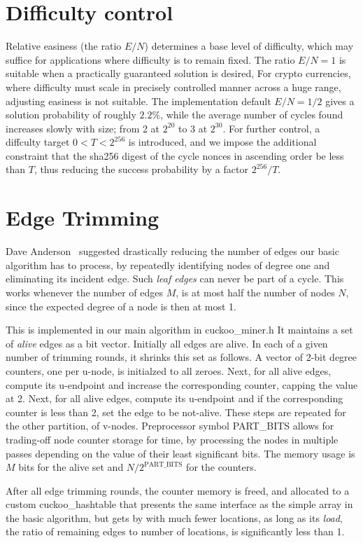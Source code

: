 \documentclass[11pt, oneside]{article}
\begin{document}
\section{Difficulty control}
Relative easiness (the ratio $E/N$) determines a base level of difficulty,
which may suffice for applications where difficulty is to remain fixed.
The ratio $E/N=1$ is suitable when a practically guaranteed solution is desired,
For crypto currencies, where difficulty must scale in precisely
controlled manner across a huge range, adjusting easiness is not suitable.
The implementation default $E/N=1/2$ gives a solution probability of roughly $2.2\%$,
while the average number of cycles found increases slowly with size; from 2 at $2^{20}$
to 3 at $2^{30}$.
For further control, a diffculty target $0 < T < 2^{256}$ is introduced,
and we impose the additional constraint that the sha256 digest of the
cycle nonces in ascending order be less than $T$, thus
reducing the success probability by a factor $2^{256}/T$.

\section{Edge Trimming}
Dave Anderson~\cite{dga2014} suggested drastically reducing the number of edges
our basic algorithm has to process, by repeatedly identifying nodes of degree one
and eliminating its incident edge. Such {\em leaf edges} can never be part of a cycle.
This works whenever the number of edges $M$, is at most half the number of nodes $N$,
since the expected degree of a node is then at most 1.

This is implemented in our main algorithm in cuckoo\_miner.h
It maintains a set of {\em alive} edges as a bit vector. Initially all edges are alive.
In each of a given number of trimming rounds, it shrinks this set as follows.
A vector of 2-bit degree counters, one per u-node, is initialzed to all zeroes.
Next, for all alive edges, compute its u-endpoint and increase the corresponding counter,
capping the value at 2.
Next, for all alive edges, compute its u-endpoint and if the corresponding counter is less than 2,
set the edge to be not-alive.
These steps are repeated for the other partition, of v-nodes.
Preprocessor symbol PART\_BITS allows for trading-off node counter storage for time,
by processing the nodes in multiple passes depending on the value of their least significant bits.
The memory usage is $M$ bits for the alive set and $N / 2^{\mbox{PART\_BITS}}$ for the counters.

After all edge trimming rounds, the counter memory is freed, and allocated to a
custom cuckoo\_hashtable that presents the same interface as the simple array in
the basic algorithm, but gets by with much fewer locations, as long as its {\em load},
the ratio of remaining edges to number of locations, is significantly less than 1.
\end{document}
